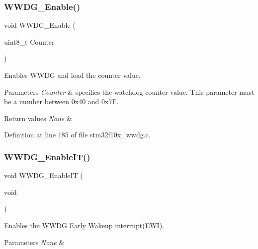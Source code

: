 \subsubsection{\texorpdfstring{W\+W\+D\+G\+\_\+\+Enable()}{WWDG\_Enable()}}
{\footnotesize\ttfamily void W\+W\+D\+G\+\_\+\+Enable (\begin{DoxyParamCaption}\item[{uint8\+\_\+t}]{Counter }\end{DoxyParamCaption})}



Enables W\+W\+DG and load the counter value. 


\begin{DoxyParams}{Parameters}
{\em Counter} & specifies the watchdog counter value. This parameter must be a number between 0x40 and 0x7F. \\
\hline
\end{DoxyParams}

\begin{DoxyRetVals}{Return values}
{\em None} & \\
\hline
\end{DoxyRetVals}


Definition at line 185 of file stm32f10x\+\_\+wwdg.\+c.

\mbox{\label{group___w_w_d_g___private___functions_gac8af66ea5254d3d78b60b9b7c7f29521}} 
\subsubsection{\texorpdfstring{W\+W\+D\+G\+\_\+\+Enable\+I\+T()}{WWDG\_EnableIT()}}
{\footnotesize\ttfamily void W\+W\+D\+G\+\_\+\+Enable\+IT (\begin{DoxyParamCaption}\item[{void}]{ }\end{DoxyParamCaption})}



Enables the W\+W\+DG Early Wakeup interrupt(\+E\+W\+I). 


\begin{DoxyParams}{Parameters}
{\em None} & \\
\hline
\end{DoxyParams}

